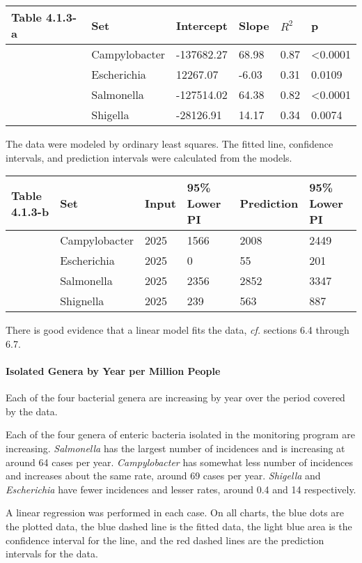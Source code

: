 \documentclass[11pt]{article}
\begin{document}
    \begin{longtable}[]{@{}llllll@{}}
\toprule
Table 4.1.3-a & Set & Intercept & Slope & \(R^{2}\) & p\tabularnewline
\midrule
\endhead
& Campylobacter & -137682.27 & 68.98 & 0.87 &
\textless{}0.0001\tabularnewline
& Escherichia & 12267.07 & -6.03 & 0.31 & 0.0109\tabularnewline
& Salmonella & -127514.02 & 64.38 & 0.82 &
\textless{}0.0001\tabularnewline
& Shigella & -28126.91 & 14.17 & 0.34 & 0.0074\tabularnewline
\bottomrule
\end{longtable}

The data were modeled by ordinary least squares. The fitted line,
confidence intervals, and prediction intervals were calculated from the
models.

\begin{longtable}[]{@{}llllll@{}}
\toprule
Table 4.1.3-b & Set & Input & 95\% Lower PI & Prediction & 95\% Lower
PI\tabularnewline
\midrule
\endhead
& Campylobacter & 2025 & 1566 & 2008 & 2449\tabularnewline
& Escherichia & 2025 & 0 & 55 & 201\tabularnewline
& Salmonella & 2025 & 2356 & 2852 & 3347\tabularnewline
& Shignella & 2025 & 239 & 563 & 887\tabularnewline
\bottomrule
\end{longtable}

There is good evidence that a linear model fits the data, \emph{cf.}
sections 6.4 through 6.7.

    \hypertarget{isolated-genera-by-year-per-million-people}{%
\paragraph{Isolated Genera by Year per Million
People}\label{isolated-genera-by-year-per-million-people}}

    Each of the four bacterial genera are increasing by year over the period
covered by the data.

Each of the four genera of enteric bacteria isolated in the monitoring
program are increasing. \emph{Salmonella} has the largest number of
incidences and is increasing at around 64 cases per year.
\emph{Campylobacter} has somewhat less number of incidences and
increases about the same rate, around 69 cases per year. \emph{Shigella}
and \emph{Escherichia} have fewer incidences and lesser rates, around
0.4 and 14 respectively.

A linear regression was performed in each case. On all charts, the blue
dots are the plotted data, the blue dashed line is the fitted data, the
light blue area is the confidence interval for the line, and the red
dashed lines are the prediction intervals for the data.
\end{document}
